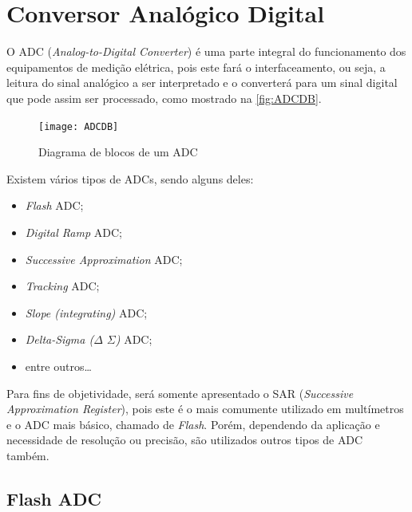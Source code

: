 \section{Conversor Analógico Digital}\label{sec:ADC}

O \gls{ADC} (\textit{Analog-to-Digital Converter}) é uma parte integral do funcionamento dos equipamentos de medição elétrica, pois este fará o interfaceamento, ou seja, a leitura do sinal analógico a ser interpretado e o converterá para um sinal digital que pode assim ser processado, como mostrado na \autoref{fig:ADCDB}.

\begin{figure}[htb!]%
    \caption{Diagrama de blocos de um ADC}%
    \label{fig:ADCDB}%
    \texttt{[image: ADCDB]}%
\end{figure}  

Existem vários tipos de \gls{ADC}s, sendo alguns deles:

\begin{itemize}
    \item \textit{Flash} \gls{ADC};
    \item \textit{Digital Ramp} \gls{ADC};
    \item \textit{Successive Approximation} \gls{ADC};
    \item \textit{Tracking} \gls{ADC};
    \item \textit{Slope (integrating)} \gls{ADC};
    \item \textit{Delta-Sigma ($\Delta$ $\Sigma$)} \gls{ADC};
    \item entre outros\dots
\end{itemize}

Para fins de objetividade, será somente apresentado o \gls{SAR} (\textit{Successive Approximation Register}), pois este é o mais comumente utilizado em multímetros e o \gls{ADC} mais básico, chamado de \textit{Flash}. Porém, dependendo da aplicação e necessidade de resolução ou precisão, são utilizados outros tipos de \gls{ADC} também.

    \subsection{Flash ADC}\label{flashADC}

